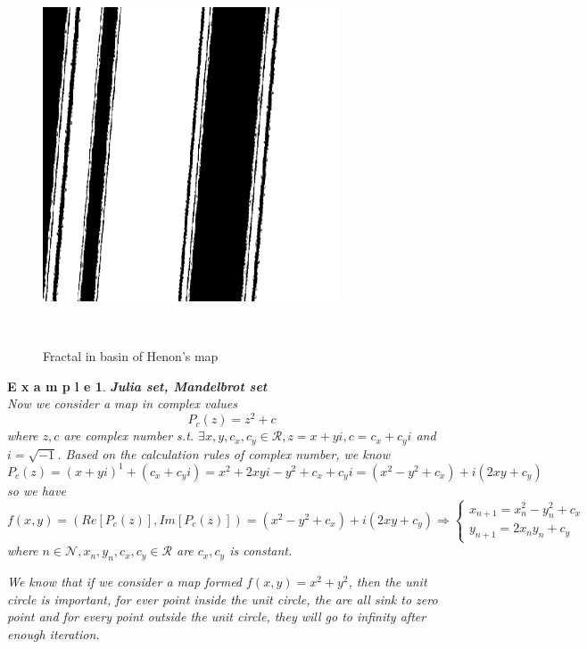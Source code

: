 \documentclass[12pt]{article}
\theoremstyle{plain}
\newtheorem{example}{\textbf{E x a m p l e}}[section]
\begin{document}
\begin{figure}[H]
\begin{minipage}[c][0.33\width]{
   0.33\textwidth}
   \includegraphics[width=.7\textwidth]{figure/section4/Henon-basin-02.png}
\end{minipage}
\\[5ex]\caption{Fractal in basin of Henon's map}\label{Fractal-henon-basin}
\end{figure}



\begin{example}\textbf{Julia set, Mandelbrot set}
\\\noindent Now we consider a map in complex values
$$
P_c(z) = z^2 + c
$$
where $z, c$ are complex number s.t. $\exists x, y, c_x, c_y \in \mathcal R, z = x + yi, c = c_x + c_yi$ and $i = \sqrt{-1}$. Based on the calculation rules of complex number, we know 
$$
P_c(z) = (x+yi)^1 + (c_x + c_yi) = x^2 + 2xyi - y^2 + c_x + c_yi = (x^2 - y^2 + c_x) + i(2xy + c_y)
$$
so we have 
$$
f(x, y) = (Re[P_c(z)], Im[P_c(z)]) = (x^2 - y^2 + c_x) + i(2xy + c_y) 
\Rightarrow \left\{
\begin{array}{l}
x_{n+1} = x_n^2 - y_n^2 + c_x \\
y_{n+1} = 2x_ny_n + c_y
\end{array}\right.
$$
where $n \in \mathcal N, x_n, y_n, c_x, c_y \in \mathcal R$ are $c_x, c_y$ is constant.

We know that if we consider a map formed $f(x,y) = x^2 + y^2$, then the unit circle is important, for ever point inside the unit circle, the are all sink to zero point and for every point outside the unit circle, they will go to infinity after enough iteration. 
\end{example}
\end{document}
